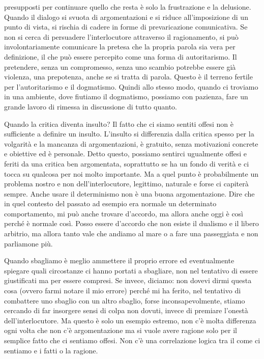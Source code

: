 \documentclass[12pt]{book} %
\begin{document}
presupposti per continuare quello che resta è solo la frustrazione e la delusione. 
Quando il dialogo si svuota di argomentazioni e si riduce all'imposizione di un punto di vista, si rischia di cadere in forme di prevaricazione comunicativa. Se non si cerca di persuadere l'interlocutore attraverso il ragionamento, si può involontariamente comunicare la pretesa che la propria parola sia vera per definizione, il che può essere percepito come una forma di autoritarismo. Il pretendere, senza un compromesso, senza uno scambio potrebbe essere già violenza, una prepotenza, anche se si tratta di parola. Questo è il terreno fertile per
l'autoritarismo e il dogmatismo. Quindi allo stesso modo, quando ci troviamo in una ambiente, dove
fiutiamo il dogmatismo, possiamo con pazienza, fare un grande lavoro di rimessa in discussione di tutto quanto. 

Quando la critica diventa insulto? Il fatto che ci siamo sentiti offesi non è sufficiente a definire un insulto.
L'insulto si differenzia dalla critica spesso per la volgarità e la mancanza di argomentazioni, è
gratuito, senza motivazioni concrete e obiettive ed è personale. Detto questo, possiamo sentirci ugualmente offesi e feriti da una
critica ben argomentata, soprattutto se ha un fondo di verità e ci tocca su qualcosa per noi molto importante. Ma a quel
punto è probabilmente un problema nostro e non dell'interlocutore, legittimo, naturale e forse ci capiterà sempre. 
Anche usare il determinismo non è una buona argomentazione. Dire che in quel contesto del passato ad esempio era normale un determinato comportamento, mi può anche trovare d'accordo, ma allora anche oggi è così perché è normale così. Posso essere d'accordo che non esiste il dualismo e il libero arbitrio, ma allora tanto vale che andiamo al mare o a fare una passeggiata e non parliamone più.

Quando sbagliamo è meglio ammettere il proprio errore ed eventualmente spiegare quali circostanze
ci hanno portati a sbagliare, non nel tentativo di essere giustificati ma per essere compresi. Se
invece, diciamo: non dovevi dirmi questa cosa (ovvero farmi notare il mio errore) perché
mi ha ferito, nel tentativo di combattere uno sbaglio con un altro sbaglio, forse inconsapevolmente, stiamo cercando di far insorgere sensi di colpa non dovuti, invece di premiare l'onestà dell'interlocutore. Ma questo è solo un esempio estremo, non c'è molta differenza ogni volta
che non c'è argomentazione ma si vuole avere ragione solo per il semplice fatto che ci sentiamo
offesi. Non c'è una correlazione logica tra il come ci sentiamo e i fatti o la ragione.
\end{document}
